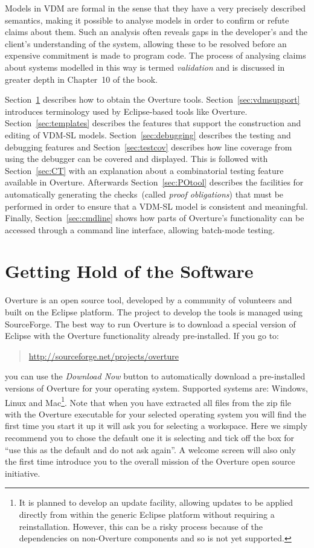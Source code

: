 Models in VDM are formal in the sense that they have a very precisely
described semantics, making it possible to analyse models in order to
confirm or refute claims about them. Such an analysis often reveals
gaps in the developer's and the client's understanding of the system,
allowing these to be resolved before an expensive commitment is made
to program code. The process of analysing claims about systems
modelled in this way is termed \emph{validation} and is discussed in
greater depth in Chapter~10 of the book.

Section~\ref{sec:install} describes how to obtain the Overture tools.
Section~\ref{sec:vdmsupport} introduces terminology used by
Eclipse-based tools like Overture. Section~\ref{sec:templates}
describes the features that support the construction and editing of
VDM-SL models.  Section~\ref{sec:debugging} describes the testing and
debugging features and Section~\ref{sec:testcov} describes how
line coverage from using the debugger can be covered and
displayed. This is followed with Section~\ref{sec:CT} with an
explanation about a combinatorial testing feature available in Overture.
Afterwards Section~\ref{sec:POtool} describes the facilities for automatically
generating the checks~(called \emph{proof obligations}) that must
be performed in order to ensure that a VDM-SL model is consistent and
meaningful.  Finally, Section~\ref{sec:cmdline} shows how parts of
Overture's functionality can be accessed through a command line
interface, allowing batch-mode testing. 

\section{Getting Hold of the Software}\label{sec:install}

Overture is an open source tool, developed by a community of
volunteers and built on the Eclipse platform. The project to develop
the tools is managed using SourceForge.  The best way to run Overture
is to download a special version of Eclipse with the Overture
functionality already pre-installed. If you go to: 
  \begin{quote}
  \url{http://sourceforge.net/projects/overture}
  \end{quote}
  \noindent you can use the \textit{Download Now} button to
  automatically download a pre-installed versions of Overture for your
  operating system.  Supported systems are: Windows, Linux and
  Mac\footnote{It is planned to develop an update facility, allowing
    updates to be applied directly from within the generic Eclipse
    platform without requiring a reinstallation. However, this can be
    a risky process because of the dependencies on non-Overture
    components and so is not yet supported.}.
Note that when you have extracted all files from the zip file with the
Overture executable for your selected operating system you will find
the first time you start it up it will ask you for selecting a
workspace. Here we simply recommend you to chose the default one it is
selecting and tick off the box for ``use this as the default and do
not ask again''. A welcome screen will also only the first time
introduce you to the overall mission of the Overture open source
initiative. 

